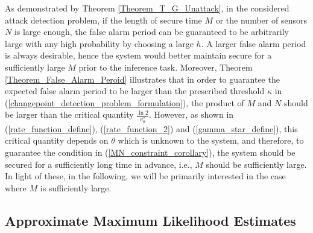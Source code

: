 \documentclass[11pt, draftclsnofoot, onecolumn]{IEEEtran}
\begin{document}
As demonstrated by {Theorem \ref{Theorem_T_G_Unattack}}, in the considered attack detection problem, if the length of secure time $M$ or the number of sensors $N$ is large enough, the false alarm period can be guaranteed to be arbitrarily large with any high probability by choosing a large $h$. A larger false alarm period is always desirable, hence the system would better maintain secure for a sufficiently large $M$ prior to the inference task.   Moreover,   {Theorem \ref{Theorem_False_Alarm_Peroid}} illustrates that in order to guarantee the expected false alarm period to be larger than the prescribed threshold $\kappa$ in (\ref{changepoint_detection_problem_formulation}), the product of $M$ and $N$ should be larger than the critical quantity $\frac{{\ln 2}}{{\upsilon _\theta ^*}}$. However, as shown in (\ref{rate_function_define}), (\ref{rate_function_2}) and (\ref{gamma_star_define}), this critical quantity depends on $\theta$ which is unknown to the system, and therefore, to guarantee the condition in (\ref{MN_constraint_corollary}), the system should be secured for a sufficiently long time in advance, i.e., $M$ should be sufficiently large. In light of these, in the following, we will be primarily interested in the case where $M$ is sufficiently large.

\subsection{Approximate Maximum Likelihood Estimates}
\end{document}
